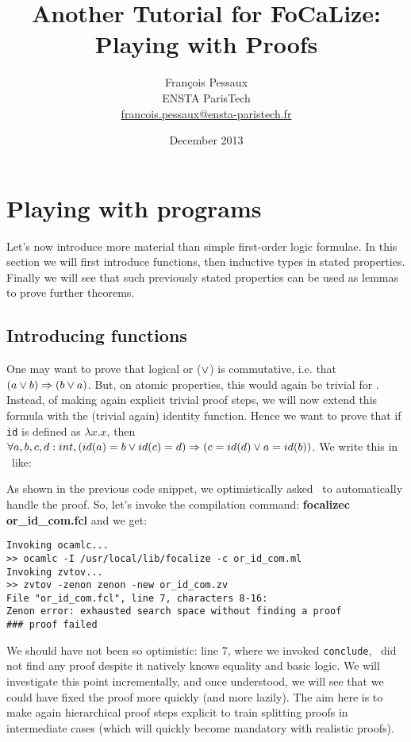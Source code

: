 \documentclass[11pt,a4paper,twoside,onecolumn,fullpage]{article}
\author{Fran\c{c}ois Pessaux\\
  ENSTA ParisTech\\
  \url{francois.pessaux@ensta-paristech.fr}}
\title{Another Tutorial for {F}o{C}a{L}ize:\\
  Playing with Proofs}
\date{December 2013}
\begin{document}
\maketitle




\section{Playing with programs}
Let's now introduce more material than simple first-order logic
formulae. In this section we will first introduce functions, then
inductive types in stated properties. Finally we will see that
such previously stated properties can be used as lemmas to prove further
theorems.

\subsection{Introducing functions}
One may want to prove that logical or ($\vee$) is commutative,
i.e. that $(a \vee b) \Rightarrow (b \vee a)$. But, on atomic
properties, this would again be trivial for \zenon. Instead, of making
again explicit trivial proof steps, we will now extend this formula
with the (trivial again) identity function. Hence we want to prove
that if \verb"id" is defined as $\lambda x.x$, then
$\forall a, b, c, d : int, (id (a) = b \vee id (c) = d) \Rightarrow (c = id (d) \vee a = id (b))$.
We write this in \focal\ like:

{\scriptsize
}

As shown in the previous code snippet, we optimistically asked \zenon\ to
automatically handle the proof. So, let's invoke the compilation
command: \textbf{focalizec or\_id\_com.fcl} and we get:

{\scriptsize
\begin{verbatim}
Invoking ocamlc...
>> ocamlc -I /usr/local/lib/focalize -c or_id_com.ml
Invoking zvtov...
>> zvtov -zenon zenon -new or_id_com.zv
File "or_id_com.fcl", line 7, characters 8-16:
Zenon error: exhausted search space without finding a proof
### proof failed
\end{verbatim}}

We should have not been so optimistic: line 7, where we invoked \lstinline"conclude",
\zenon\ did not find any proof despite it natively knows equality and
basic logic. We will investigate this point incrementally, and once
understood, we will see that we could have fixed the proof more
quickly (and more lazily). The aim here is to make again hierarchical
proof steps explicit to train splitting proofs in intermediate cases
(which will quickly become mandatory with realistic proofs).
\end{document}

